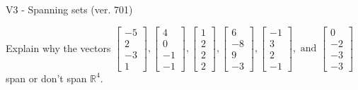 \begin{exercise}
  \begin{exerciseTitle}V3 - Spanning sets (ver. 701)\end{exerciseTitle}
  \begin{exerciseStatement}
    Explain why the vectors \(\left[\begin{array}{r}
-5 \\
2 \\
-3 \\
1
\end{array}\right] , \left[\begin{array}{r}
4 \\
0 \\
-1 \\
-1
\end{array}\right] , \left[\begin{array}{r}
1 \\
2 \\
2 \\
2
\end{array}\right] , \left[\begin{array}{r}
6 \\
-8 \\
9 \\
-3
\end{array}\right] , \left[\begin{array}{r}
-1 \\
3 \\
2 \\
-1
\end{array}\right] , \text{ and } \left[\begin{array}{r}
0 \\
-2 \\
-3 \\
-3
\end{array}\right]\) span or don't span \(\mathbb{R}^4\). 
	



\end{exerciseStatement}
\end{exercise}
